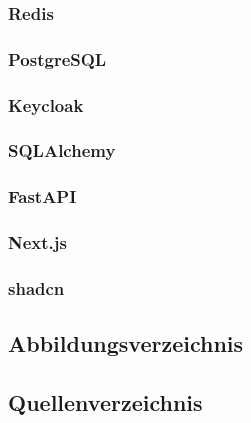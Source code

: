 \subsubsection{Redis}

\subsubsection{PostgreSQL}

\subsubsection{Keycloak}

\subsubsection{SQLAlchemy}

\subsubsection{FastAPI}

\subsubsection{Next.js}

\subsubsection{shadcn}

\subsection{Abbildungsverzeichnis}
\listoffigures

\subsection{Quellenverzeichnis}
% 
% 